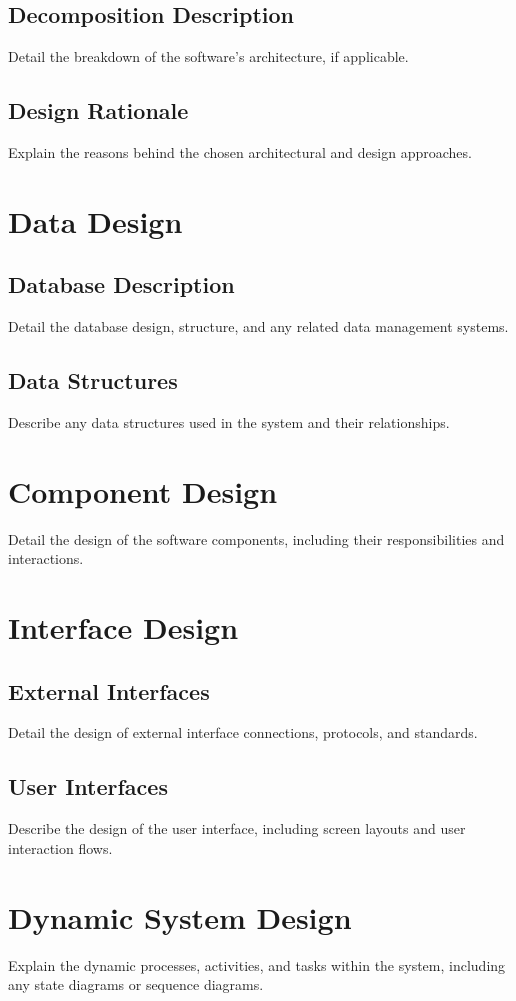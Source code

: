 \documentclass{article}
\begin{document}
\subsection{Decomposition Description}
Detail the breakdown of the software’s architecture, if applicable.

\subsection{Design Rationale}
Explain the reasons behind the chosen architectural and design approaches.

\section{Data Design}
\subsection{Database Description}
Detail the database design, structure, and any related data management systems.

\subsection{Data Structures}
Describe any data structures used in the system and their relationships.

\section{Component Design}
Detail the design of the software components, including their responsibilities and interactions.

\section{Interface Design}
\subsection{External Interfaces}
Detail the design of external interface connections, protocols, and standards.

\subsection{User Interfaces}
Describe the design of the user interface, including screen layouts and user interaction flows.

\section{Dynamic System Design}
Explain the dynamic processes, activities, and tasks within the system, including any state diagrams or sequence diagrams.
\end{document}

